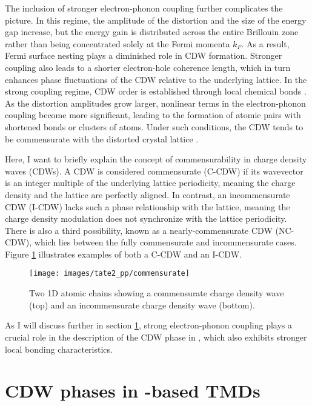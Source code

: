 The inclusion of stronger electron-phonon coupling further complicates the picture.
In this regime, the amplitude of the distortion and the size of the energy gap increase, but the energy gain is distributed across the entire Brillouin zone rather than being concentrated solely at the Fermi momenta $k_F$.
As a result, Fermi surface nesting plays a diminished role in CDW formation.
Stronger coupling also leads to a shorter electron-hole coherence length, which in turn enhances phase fluctuations of the CDW relative to the underlying lattice.
In the strong coupling regime, CDW order is established through local chemical bonds \cite{rossnagel_origin_2011, whangbo_analogies_1992, mcmillan_microscopic_1977, haas_chemical_1978, inglesfield_bonding_1980}.
As the distortion amplitudes grow larger, nonlinear terms in the electron-phonon coupling become more significant, leading to the formation of atomic pairs with shortened bonds or clusters of atoms.
Under such conditions, the CDW tends to be commensurate with the distorted crystal lattice \cite{rossnagel_origin_2011}.

Here, I want to briefly explain the concept of commensurability in charge density waves (CDWs).
A CDW is considered commensurate (C-CDW) if its wavevector is an integer multiple of the underlying lattice periodicity, meaning the charge density and the lattice are perfectly aligned.
In contrast, an incommensurate CDW (I-CDW) lacks such a phase relationship with the lattice, meaning the charge density modulation does not synchronize with the lattice periodicity.
There is also a third possibility, known as a nearly-commensurate CDW (NC-CDW), which lies between the fully commensurate and incommensurate cases. Figure \ref{fig:commensurate} illustrates examples of both a C-CDW and an I-CDW.

\begin{figure}[t]
	\centering
	\texttt{[image: images/tate2\_pp/commensurate]}
	\caption{Two 1D atomic chains showing a commensurate charge density wave (top) and an incommensurate charge density wave (bottom).}
	\label{fig:commensurate}
\end{figure}

As I will discuss further in section \ref{sec:cdw_tate2}, strong electron-phonon coupling plays a crucial role in the description of the CDW phase in , which also exhibits stronger local bonding characteristics.

\section{CDW phases in -based TMDs}
\label{sec:cdw_tate2}

